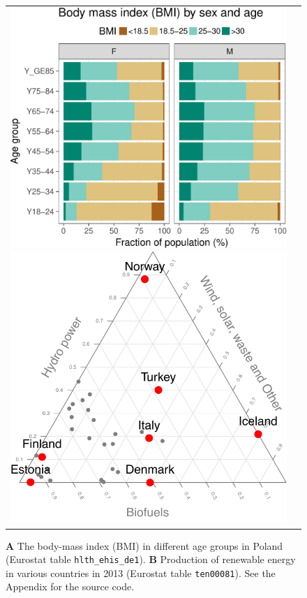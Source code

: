 \begin{figure}
\begin{center}
\begin{tabular}{cc}
\includegraphics{2015-manu-bmi-1}
\includegraphics{2015-manu-energy-2}
\end{tabular}
\end{center}
\caption{{\bf A} The body-mass index (BMI) in different age groups in Poland (Eurostat table \texttt{hlth\_ehis\_de1}). {\bf B} Production of renewable energy in various countries in 2013 (Eurostat table \texttt{ten00081}). See the Appendix for the source code.}
\label{fig:bmi}
\end{figure}



